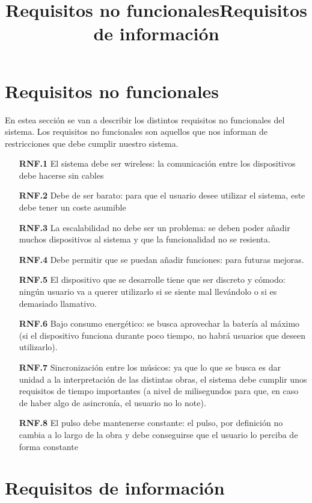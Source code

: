 \title{Requisitos no funcionales}
\section{Requisitos no funcionales}

En estea sección se van a describir los distintos requisitos no funcionales del sistema.
Los requisitos no funcionales son aquellos que nos informan de restricciones que debe cumplir
nuestro sistema.\\


\begin{itemize}
    \item[\textbf{RNF.1}] El sistema debe ser wireless: la comunicación entre los
      dispositivos debe hacerse sin cables
    \item[\textbf{RNF.2}] Debe de ser barato: para que el usuario desee utilizar
      el sistema, este debe tener un coste asumible
    \item[\textbf{RNF.3}] La escalabilidad no debe ser un problema: se deben poder añadir
      muchos dispositivos al sistema y que la funcionalidad no se resienta.
    \item[\textbf{RNF.4}] Debe permitir que se puedan añadir funciones: para futuras mejoras.
    \item[\textbf{RNF.5}] El dispositivo que se desarrolle tiene que ser discreto y cómodo:
      ningún usuario va a querer utilizarlo si se siente mal llevándolo o si es demasiado llamativo.
    \item[\textbf{RNF.6}] Bajo consumo energético: se busca aprovechar la batería al máximo
      (si el dispositivo funciona durante poco tiempo, no habrá usuarios que deseen utilizarlo).
    \item[\textbf{RNF.7}] Sincronización entre los músicos: ya que lo que se busca es dar unidad
      a la interpretación de las distintas obras, el sistema debe cumplir unos requisitos de tiempo
      importantes (a nivel de milisegundos para que, en caso de haber algo de asincronía, el usuario no lo note).
    \item[\textbf{RNF.8}] El pulso debe mantenerse constante: el pulso, por definición
      no cambia a lo largo de la obra y debe conseguirse que el usuario lo perciba de forma
      constante
\end{itemize}


\title{Requisitos de información}
\section{Requisitos de información}

